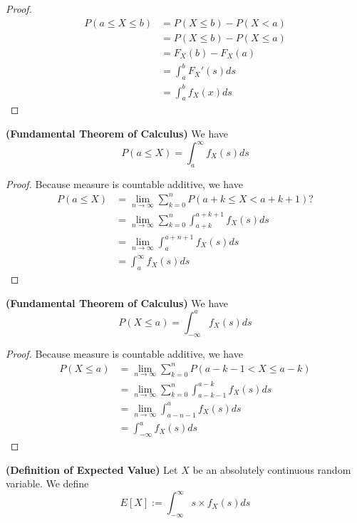 \documentclass{report}
\begin{document}
\begin{proof}
\begin{align}
  P(a\leq X\leq b)&=P(X\leq b)-P(X<a)\\
&=P(X\leq b)-P(X\leq a)\\
&=F_X(b)-F_X(a)\\
&=\int_a^b F_X'(s)ds\\
&=\int_a^b f_X(x)ds
\end{align}
\end{proof}
\begin{corollary}
\label{2.1.6}
\textbf{(Fundamental Theorem of Calculus)} We have
\begin{equation}
P(a\leq X)=\int_a^\infty f_X(s)ds
\end{equation}
\end{corollary}
\begin{proof}
Because measure is countable additive, we have
\begin{align}
P(a\leq X)&=\lim_{n\to\infty}\sum_{k=0}^n P(a+k\leq X<a+k+1)?\\
&=\lim_{n\to\infty}\sum_{k=0}^n \int_{a+k}^{a+k+1}f_X(s)ds\\
&=\lim_{n\to\infty}\int_a^{a+n+1} f_X(s)ds\\
&=\int_a^\infty f_X(s)ds
\end{align}
\end{proof}
\begin{corollary}
\label{2.1.7}
\textbf{(Fundamental Theorem of Calculus)} We have
\begin{equation}
P(X\leq a)=\int_{-\infty}^a f_X(s)ds
\end{equation}
\end{corollary}
\begin{proof}
Because measure is countable additive, we have
\begin{align}
  P(X\leq a)&=\lim_{n\to\infty}\sum_{k=0}^n P(a-k-1<X\leq a-k)\\
&=\lim_{n\to\infty} \sum_{k=0}^n \int_{a-k-1}^{a-k} f_X(s)ds\\
&=\lim_{n\to\infty} \int^a_{a-n-1}f_X(s)ds\\
&=\int^a_{-\infty}f_X(s)ds
\end{align}
\end{proof}
\begin{definition}
\label{2.1.8}
\textbf{(Definition of Expected Value)} Let $X$ be an absolutely continuous random variable. We define
 \begin{equation}
E[X]:=\int_{-\infty}^\infty s\times f_X(s)ds
\end{equation}
\end{definition}
\end{document}
